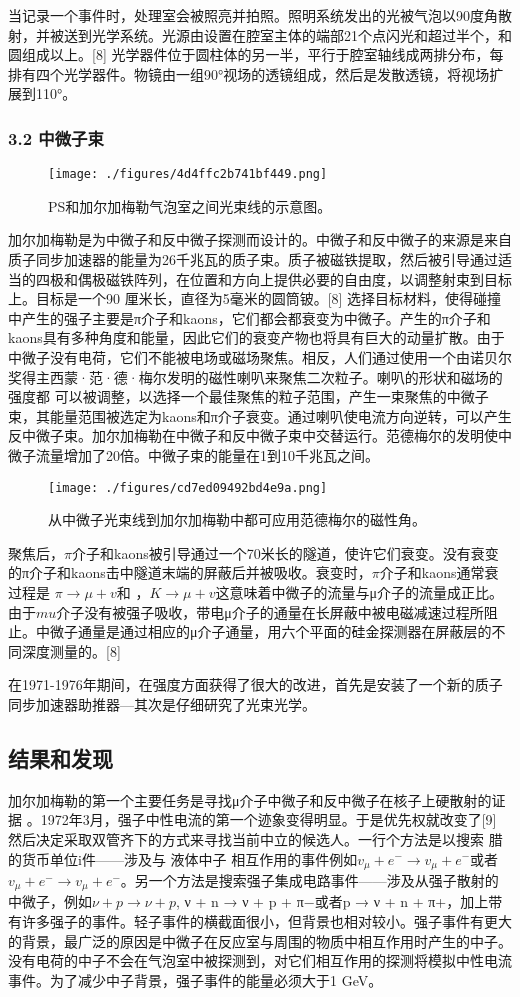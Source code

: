 当记录一个事件时，处理室会被照亮并拍照。照明系统发出的光被气泡以90度角散射，并被送到光学系统。光源由设置在腔室主体的端部21个点闪光和超过半个，和圆组成以上。[8] 光学器件位于圆柱体的另一半，平行于腔室轴线成两排分布，每排有四个光学器件。物镜由一组90°视场的透镜组成，然后是发散透镜，将视场扩展到110°。
\subsubsection{3.2 中微子束}
\begin{figure}[ht]
\centering
\texttt{[image: ./figures/4d4ffc2b741bf449.png]}
\caption{PS和加尔加梅勒气泡室之间光束线的示意图。} \label{fig_JRJML_4}
\end{figure}
加尔加梅勒是为中微子和反中微子探测而设计的。中微子和反中微子的来源是来自质子同步加速器的能量为26千兆瓦的质子束。质子被磁铁提取，然后被引导通过适当的四极和偶极磁铁阵列，在位置和方向上提供必要的自由度，以调整射束到目标上。目标是一个90 厘米长，直径为5毫米的圆筒铍。[8] 选择目标材料，使得碰撞中产生的强子主要是π介子和kaons，它们都会都衰变为中微子。产生的π介子和kaons具有多种角度和能量，因此它们的衰变产物也将具有巨大的动量扩散。由于中微子没有电荷，它们不能被电场或磁场聚焦。相反，人们通过使用一个由诺贝尔奖得主西蒙·范·德·梅尔发明的磁性喇叭来聚焦二次粒子。喇叭的形状和磁场的强度都 可以被调整，以选择一个最佳聚焦的粒子范围，产生一束聚焦的中微子束，其能量范围被选定为kaons和π介子衰变。通过喇叭使电流方向逆转，可以产生反中微子束。加尔加梅勒在中微子和反中微子束中交替运行。范德梅尔的发明使中微子流量增加了20倍。中微子束的能量在1到10千兆瓦之间。
\begin{figure}[ht]
\centering
\texttt{[image: ./figures/cd7ed09492bd4e9a.png]}
\caption{从中微子光束线到加尔加梅勒中都可应用范德梅尔的磁性角。} \label{fig_JRJML_5}
\end{figure}
聚焦后，$\pi$介子和kaons被引导通过一个70米长的隧道，使许它们衰变。没有衰变的π介子和kaons击中隧道末端的屏蔽后并被吸收。衰变时，$\pi$介子和kaons通常衰过程是 $\pi \to \mu + v$和 ，$K\to \mu + v$这意味着中微子的流量与μ介子的流量成正比。由于$mu$介子没有被强子吸收，带电μ介子的通量在长屏蔽中被电磁减速过程所阻止。中微子通量是通过相应的μ介子通量，用六个平面的硅金探测器在屏蔽层的不同深度测量的。[8]

在1971-1976年期间，在强度方面获得了很大的改进，首先是安装了一个新的质子同步加速器助推器—其次是仔细研究了光束光学。

\subsection{结果和发现}
加尔加梅勒的第一个主要任务是寻找μ介子中微子和反中微子在核子上硬散射的证据 。1972年3月，强子中性电流的第一个迹象变得明显。于是优先权就改变了[9] 然后决定采取双管齐下的方式来寻找当前中立的候选人。一行个方法是以搜索 腊的货币单位i件——涉及与 液体中子 相互作用的事件例如$v_\mu+e^-\to v_\mu+e^-$或者$v_\mu+e^-\to v_\mu+e^-$。另一个方法是搜索强子集成电路事件——涉及从强子散射的中微子，例如$ν + p \to ν + p$, ν + n → ν + p + π−或者p → ν + n + π+，加上带有许多强子的事件。轻子事件的横截面很小，但背景也相对较小。强子事件有更大的背景，最广泛的原因是中微子在反应室与周围的物质中相互作用时产生的中子。没有电荷的中子不会在气泡室中被探测到，对它们相互作用的探测将模拟中性电流事件。为了减少中子背景，强子事件的能量必须大于1 GeV。

